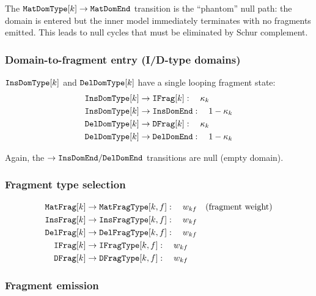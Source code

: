 The $\mathtt{MatDomType}[k] \to \mathtt{MatDomEnd}$ transition is the ``phantom''
null path: the domain is entered but the inner model immediately terminates
with no fragments emitted. This leads to null cycles that must be eliminated by Schur complement.

\subsubsection{Domain-to-fragment entry (I/D-type domains)}

$\mathtt{InsDomType}[k]$ and $\mathtt{DelDomType}[k]$ have a single looping fragment state:
\begin{align}
\mathtt{InsDomType}[k] &\to \mathtt{IFrag}[k]: \quad \kappa_k \\
\mathtt{InsDomType}[k] &\to \mathtt{InsDomEnd}: \quad 1 - \kappa_k \\
\mathtt{DelDomType}[k] &\to \mathtt{DFrag}[k]: \quad \kappa_k \\
\mathtt{DelDomType}[k] &\to \mathtt{DelDomEnd}: \quad 1 - \kappa_k
\end{align}

Again, the $\to \mathtt{InsDomEnd} / \mathtt{DelDomEnd}$ transitions are null (empty domain).

\subsubsection{Fragment type selection}

\begin{align}
\mathtt{MatFrag}[k] &\to \mathtt{MatFragType}[k,f]: \quad w_{kf} \quad\text{(fragment weight)} \\
\mathtt{InsFrag}[k] &\to \mathtt{InsFragType}[k,f]: \quad w_{kf} \\
\mathtt{DelFrag}[k] &\to \mathtt{DelFragType}[k,f]: \quad w_{kf} \\
\mathtt{IFrag}[k] &\to \mathtt{IFragType}[k,f]: \quad w_{kf} \\
\mathtt{DFrag}[k] &\to \mathtt{DFragType}[k,f]: \quad w_{kf}
\end{align}

\subsubsection{Fragment emission}

